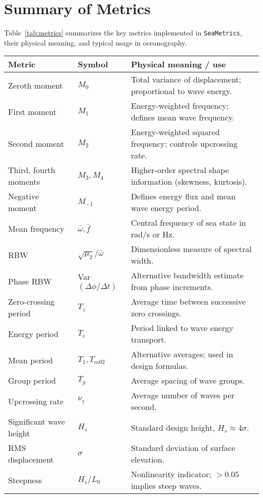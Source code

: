 \documentclass[11pt]{article}
\begin{document}
\section{Summary of Metrics}

Table~\ref{tab:metrics} summarizes the key metrics implemented in
\texttt{SeaMetrics}, their physical meaning, and typical usage in
oceanography.

\begin{table}[H]
\centering
\renewcommand{\arraystretch}{1.2}
\begin{tabular}{|l|l|p{8cm}|}
\hline
\textbf{Metric} & \textbf{Symbol} & \textbf{Physical meaning / use} \\
\hline
Zeroth moment & $M_0$ & Total variance of displacement; proportional to wave energy. \\
First moment & $M_1$ & Energy-weighted frequency; defines mean wave frequency. \\
Second moment & $M_2$ & Energy-weighted squared frequency; controls upcrossing rate. \\
Third, fourth moments & $M_3, M_4$ & Higher-order spectral shape information (skewness, kurtosis). \\
Negative moment & $M_{-1}$ & Defines energy flux and mean wave energy period. \\
\hline
Mean frequency & $\bar{\omega}, \bar{f}$ & Central frequency of sea state in rad/s or Hz. \\
RBW & $\sqrt{\mu_2}/\bar{\omega}$ & Dimensionless measure of spectral width. \\
Phase RBW & Var$(\Delta \phi / \Delta t)$ & Alternative bandwidth estimate from phase increments. \\
\hline
Zero-crossing period & $T_z$ & Average time between successive zero crossings. \\
Energy period & $T_e$ & Period linked to wave energy transport. \\
Mean period & $T_1, T_{m02}$ & Alternative averages; used in design formulas. \\
Group period & $T_g$ & Average spacing of wave groups. \\
Upcrossing rate & $\nu_\uparrow$ & Average number of waves per second. \\
\hline
Significant wave height & $H_s$ & Standard design height, $H_s \approx 4\sigma$. \\
RMS displacement & $\sigma$ & Standard deviation of surface elevation. \\
Steepness & $H_s/L_0$ & Nonlinearity indicator; $>0.05$ implies steep waves. \\

\end{tabular}
\end{table}
\end{document}

